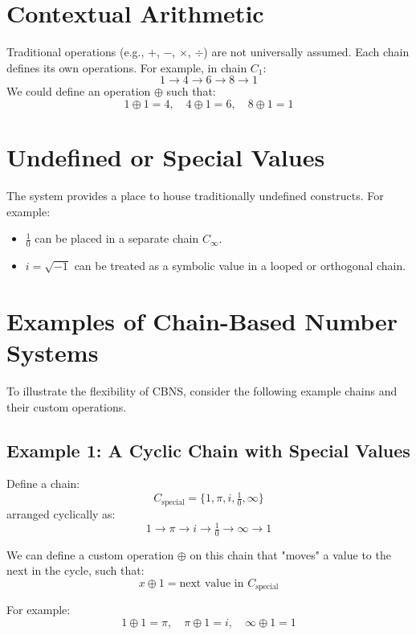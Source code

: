 \documentclass{article}
\begin{document}
\section{Contextual Arithmetic}
Traditional operations (e.g., $+$, $-$, $\times$, $\div$) are not universally assumed. Each chain defines its own operations. For example, in chain $C_1$:
\begin{equation*}
1 \rightarrow 4 \rightarrow 6 \rightarrow 8 \rightarrow 1
\end{equation*}
We could define an operation $\oplus$ such that:
\begin{equation*}
1 \oplus 1 = 4,\quad 4 \oplus 1 = 6,\quad 8 \oplus 1 = 1
\end{equation*}

\section{Undefined or Special Values}
The system provides a place to house traditionally undefined constructs. For example:
\begin{itemize}
    \item $\frac{1}{0}$ can be placed in a separate chain $C_{\infty}$.
    \item $i = \sqrt{-1}$ can be treated as a symbolic value in a looped or orthogonal chain.
\end{itemize}

\section{Examples of Chain-Based Number Systems}

To illustrate the flexibility of CBNS, consider the following example chains and their custom operations.

\subsection{Example 1: A Cyclic Chain with Special Values}

Define a chain:
\[
C_{\text{special}} = \{1, \pi, i, \tfrac{1}{0}, \infty\}
\]
arranged cyclically as:
\[
1 \rightarrow \pi \rightarrow i \rightarrow \tfrac{1}{0} \rightarrow \infty \rightarrow 1
\]

We can define a custom operation \(\oplus\) on this chain that "moves" a value to the next in the cycle, such that:
\[
x \oplus 1 = \text{next value in } C_{\text{special}}
\]

For example:
\[
1 \oplus 1 = \pi, \quad \pi \oplus 1 = i, \quad \infty \oplus 1 = 1
\]
\end{document}
